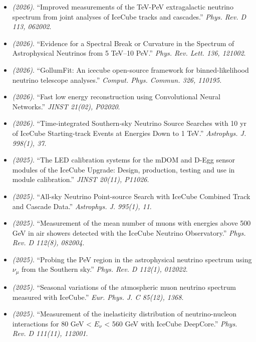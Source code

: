 \begin{itemize}
\item \textit{(2026)}. ``Improved measurements of the TeV-PeV extragalactic neutrino spectrum from joint analyses of IceCube tracks and cascades.'' \textit{Phys. Rev. D 113, 062002}.  
\item \textit{(2026)}. ``Evidence for a Spectral Break or Curvature in the Spectrum of Astrophysical Neutrinos from 5 TeV--10 PeV.'' \textit{Phys. Rev. Lett. 136, 121002}.  
\item \textit{(2026)}. ``GollumFit: An icecube open-source framework for binned-likelihood neutrino telescope analyses.'' \textit{Comput. Phys. Commun. 326, 110195}.  
\item \textit{(2026)}. ``Fast low energy reconstruction using Convolutional Neural Networks.'' \textit{JINST 21(02), P02020}.  
\item \textit{(2026)}. ``Time-integrated Southern-sky Neutrino Source Searches with 10 yr of IceCube Starting-track Events at Energies Down to 1 TeV.'' \textit{Astrophys. J. 998(1), 37}.  
\item \textit{(2025)}. ``The LED calibration systems for the mDOM and D-Egg sensor modules of the IceCube Upgrade: Design, production, testing and use in module calibration.'' \textit{JINST 20(11), P11026}.  
\item \textit{(2025)}. ``All-sky Neutrino Point-source Search with IceCube Combined Track and Cascade Data.'' \textit{Astrophys. J. 995(1), 11}.  
\item \textit{(2025)}. ``Measurement of the mean number of muons with energies above 500 GeV in air showers detected with the IceCube Neutrino Observatory.'' \textit{Phys. Rev. D 112(8), 082004}.  
\item \textit{(2025)}. ``Probing the PeV region in the astrophysical neutrino spectrum using $\nu_\mu$ from the Southern sky.'' \textit{Phys. Rev. D 112(1), 012022}.  
\item \textit{(2025)}. ``Seasonal variations of the atmospheric muon neutrino spectrum measured with IceCube.'' \textit{Eur. Phys. J. C 85(12), 1368}.  
\item \textit{(2025)}. ``Measurement of the inelasticity distribution of neutrino-nucleon interactions for 80 GeV < $E_\nu$ < 560 GeV with IceCube DeepCore.'' \textit{Phys. Rev. D 111(11), 112001}.  

\end{itemize}
